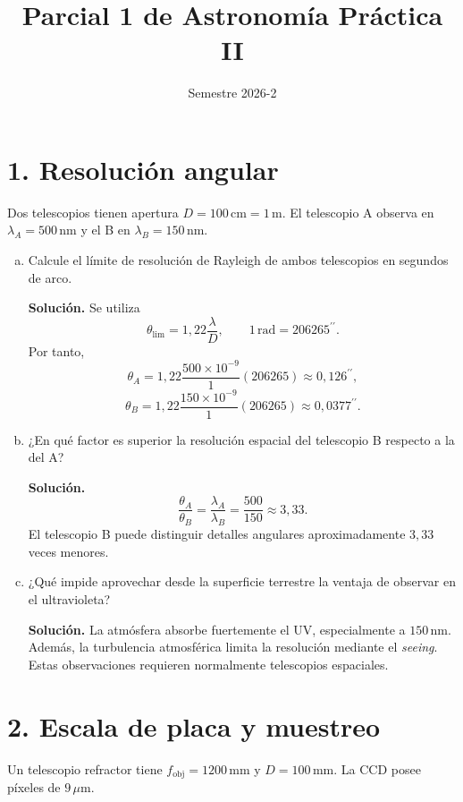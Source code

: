 \documentclass[a4paper,11pt]{article}
\title{Parcial 1 de Astronomía Práctica II}
\author{}
\date{Semestre 2026-2}
\newcommand{\respuesta}[1]{\par\textcolor{blue!60!black}{\textbf{Solución.}} #1}
\begin{document}
\maketitle

\section*{1. Resolución angular}

Dos telescopios tienen apertura $D=100\,\mathrm{cm}=1\,\mathrm{m}$. El telescopio A observa en $\lambda_A=500\,\mathrm{nm}$ y el B en $\lambda_B=150\,\mathrm{nm}$.

\begin{enumerate}[a)]
    \item Calcule el límite de resolución de Rayleigh de ambos telescopios en segundos de arco.

    \respuesta{Se utiliza
    \[
        \theta_{\mathrm{lim}}=1{,}22\frac{\lambda}{D},
        \qquad
        1\,\mathrm{rad}=206265^{\prime\prime}.
    \]
    Por tanto,
    \[
        \theta_A=1{,}22\frac{500\times10^{-9}}{1}(206265)
        \approx0{,}126^{\prime\prime},
    \]
    \[
        \theta_B=1{,}22\frac{150\times10^{-9}}{1}(206265)
        \approx0{,}0377^{\prime\prime}.
    \]}

    \item ¿En qué factor es superior la resolución espacial del telescopio B respecto a la del A?

    \respuesta{
    \[
        \frac{\theta_A}{\theta_B}
        =\frac{\lambda_A}{\lambda_B}
        =\frac{500}{150}\approx3{,}33.
    \]
    El telescopio B puede distinguir detalles angulares aproximadamente $3{,}33$ veces menores.}

    \item ¿Qué impide aprovechar desde la superficie terrestre la ventaja de observar en el ultravioleta?

    \respuesta{La atmósfera absorbe fuertemente el UV, especialmente a $150\,\mathrm{nm}$. Además, la turbulencia atmosférica limita la resolución mediante el \textit{seeing}. Estas observaciones requieren normalmente telescopios espaciales.}
\end{enumerate}

\section*{2. Escala de placa y muestreo}

Un telescopio refractor tiene $f_{\mathrm{obj}}=1200\,\mathrm{mm}$ y $D=100\,\mathrm{mm}$. La CCD posee píxeles de $9\,\mu\mathrm{m}$.
\end{document}
